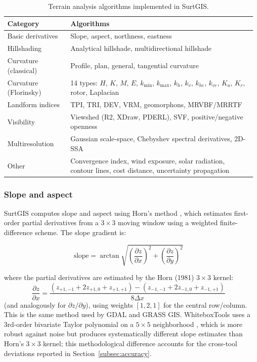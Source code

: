 \documentclass[preprint,review,12pt,authoryear]{elsarticle}
\begin{document}
\begin{table}[htbp]
\centering
\caption{Terrain analysis algorithms implemented in SurtGIS.}
\label{tab:terrain}
\begin{tabular}{@{}lp{9cm}@{}}
\toprule
Category & Algorithms \\
\midrule
Basic derivatives & Slope, aspect, northness, eastness \\
Hillshading & Analytical hillshade, multidirectional hillshade \\
Curvature (classical) & Profile, plan, general, tangential curvature \\
Curvature (Florinsky) & 14 types: $H$, $K$, $M$, $E$, $k_{\min}$, $k_{\max}$, $k_h$, $k_v$, $k_{he}$, $k_{ve}$, $K_a$, $K_r$, rotor, Laplacian \\
Landform indices & TPI, TRI, DEV, VRM, geomorphons, MRVBF/MRRTF \\
Visibility & Viewshed (R2, XDraw, PDERL), SVF, positive/negative openness \\
Multiresolution & Gaussian scale-space, Chebyshev spectral derivatives, 2D-SSA \\
Other & Convergence index, wind exposure, solar radiation, contour lines, cost distance, uncertainty propagation \\
\bottomrule
\end{tabular}
\end{table}

\subsubsection{Slope and aspect}

SurtGIS computes slope and aspect using Horn's method \citep{horn1981}, which estimates first-order partial derivatives from a $3 \times 3$ moving window using a weighted finite-difference scheme. The slope gradient is:

\begin{equation}
\text{slope} = \arctan\!\sqrt{\left(\frac{\partial z}{\partial x}\right)^2 + \left(\frac{\partial z}{\partial y}\right)^2}
\label{eq:slope}
\end{equation}

\noindent where the partial derivatives are estimated by the Horn (1981) $3 \times 3$ kernel:
\begin{equation}
\frac{\partial z}{\partial x} = \frac{(z_{+1,-1} + 2z_{+1,0} + z_{+1,+1}) - (z_{-1,-1} + 2z_{-1,0} + z_{-1,+1})}{8 \Delta x}
\label{eq:horn_kernel}
\end{equation}
\noindent (and analogously for $\partial z / \partial y$), using weights $[1, 2, 1]$ for the central row/column. This is the same method used by GDAL and GRASS GIS. WhiteboxTools uses a 3rd-order bivariate Taylor polynomial on a $5 \times 5$ neighborhood \citep{florinsky2016}, which is more robust against noise but produces systematically different slope estimates than Horn's $3 \times 3$ kernel; this methodological difference accounts for the cross-tool deviations reported in Section~\ref{subsec:accuracy}.
\end{document}
